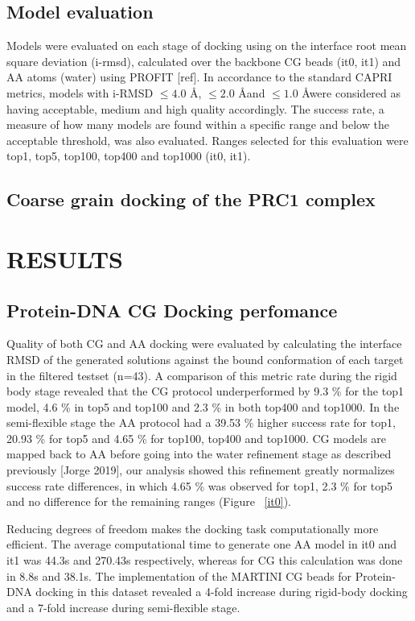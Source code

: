 \documentclass[a4,center,fleqn]{NAR}
\begin{document}
\subsection{Model evaluation}
Models were evaluated on each stage of docking using on the interface root mean square deviation (i-rmsd), calculated over the backbone CG beads (it0, it1) and AA atoms (water) using PROFIT [ref]. In accordance to the standard CAPRI metrics, models with i-RMSD $\leq 4.0$ \AA, $\leq 2.0$ \AA and $\leq 1.0$ \AA were considered as having acceptable, medium and high quality accordingly. The success rate, a measure of how many models are found within a specific range and below the acceptable threshold, was also evaluated. Ranges selected for this evaluation were top1, top5, top100, top400 and top1000 (it0, it1).

\subsection{Coarse grain docking of the PRC1 complex}

\section{RESULTS}

\subsection{Protein-DNA CG Docking perfomance}
Quality of both CG and AA docking were evaluated by calculating the interface RMSD of the generated solutions against the bound conformation of each target in the filtered testset (n=43). A comparison of this metric rate during the rigid body stage revealed that the CG protocol underperformed by 9.3 \% for the top1 model, 4.6 \% in top5 and top100 and 2.3 \% in both top400 and top1000. In the semi-flexible stage the AA protocol had a 39.53 \% higher success rate for top1, 20.93 \% for top5 and 4.65 \% for top100, top400 and top1000. %
CG models are mapped back to AA before going into the water refinement stage as described previously [Jorge 2019], our analysis showed this refinement greatly normalizes success rate differences, in which 4.65 \% was observed for top1, 2.3 \% for top5 and no difference for the remaining ranges (Figure ~\ref{it0}).

Reducing degrees of freedom makes the docking task computationally more efficient. The average computational time to generate one AA model in it0 and it1 was 44.3s and 270.43s respectively, whereas for CG this calculation was done in 8.8s and 38.1s. The implementation of the MARTINI CG beads for Protein-DNA docking in this dataset revealed a 4-fold increase during rigid-body docking and a 7-fold increase during semi-flexible stage. %
\end{document}
